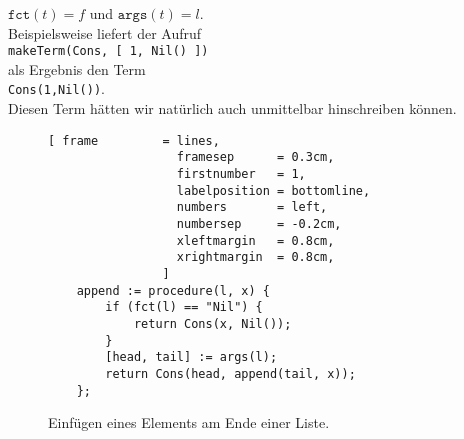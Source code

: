 \begin{enumerate}
      $\mathtt{fct}(t) = f$  \quad und \quad $\mathtt{args}(t) = l$.
      \\[0.2cm]
      Beispielsweise liefert der Aufruf
      \\[0.2cm]
      \hspace*{1.3cm}
      \texttt{makeTerm(Cons, [ 1, Nil() ])}
      \\[0.2cm]
      als Ergebnis den Term
      \\[0.2cm]
      \hspace*{1.3cm}
      \texttt{Cons(1,Nil())}.
      \\[0.2cm]
      Diesen Term hätten wir natürlich auch unmittelbar hinschreiben können.
\end{enumerate}

\begin{figure}[!ht]
\centering
\begin{Verbatim}[ frame         = lines, 
                  framesep      = 0.3cm, 
                  firstnumber   = 1,
                  labelposition = bottomline,
                  numbers       = left,
                  numbersep     = -0.2cm,
                  xleftmargin   = 0.8cm,
                  xrightmargin  = 0.8cm,
                ]
    append := procedure(l, x) {
        if (fct(l) == "Nil") {
            return Cons(x, Nil());
        }
        [head, tail] := args(l);
        return Cons(head, append(tail, x));
    };
\end{Verbatim}
\vspace*{-0.3cm}
\caption{Einfügen eines Elements am Ende einer Liste.}
\label{fig:append.stlx}
\end{figure}

